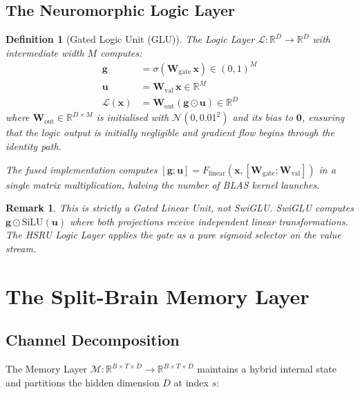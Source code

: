 \documentclass[11pt]{article}
\newtheorem{definition}{Definition}[section]
\newtheorem{remark}{Remark}[section]
\begin{document}
\subsection{The Neuromorphic Logic Layer}

\begin{definition}[Gated Logic Unit (GLU)]
The Logic Layer $\mathcal{L} : \mathbb{R}^D \to \mathbb{R}^D$ with intermediate width $M$ computes:
\begin{align}
    \mathbf{g} &= \sigma\!\left(\mathbf{W}_{\mathrm{gate}}\, \mathbf{x}\right) \in (0,1)^M \label{eq:gate} \\
    \mathbf{u} &= \mathbf{W}_{\mathrm{val}}\, \mathbf{x} \in \mathbb{R}^M \label{eq:val} \\
    \mathcal{L}(\mathbf{x}) &= \mathbf{W}_{\mathrm{out}}\!\left( \mathbf{g} \odot \mathbf{u} \right) \in \mathbb{R}^D \label{eq:glm_out}
\end{align}
where $\mathbf{W}_{\mathrm{out}} \in \mathbb{R}^{D \times M}$ is initialised with $\mathcal{N}(0, 0.01^2)$ and its bias to $\mathbf{0}$, ensuring that the logic output is initially negligible and gradient flow begins through the identity path.

The fused implementation computes $[\mathbf{g}; \mathbf{u}] = F_{\mathrm{linear}}(\mathbf{x}, [\mathbf{W}_{\mathrm{gate}};\mathbf{W}_{\mathrm{val}}])$ in a single matrix multiplication, halving the number of BLAS kernel launches.
\end{definition}

\begin{remark}
This is strictly a \emph{Gated Linear Unit}, not SwiGLU. SwiGLU computes $\mathbf{g} \odot \mathrm{SiLU}(\mathbf{u})$ where both projections receive independent linear transformations. The HSRU Logic Layer applies the gate as a pure sigmoid selector on the value stream.
\end{remark}

\section{The Split-Brain Memory Layer}

\subsection{Channel Decomposition}

The Memory Layer $\mathcal{M} : \mathbb{R}^{B \times T \times D} \to \mathbb{R}^{B \times T \times D}$ maintains a hybrid internal state and partitions the hidden dimension $D$ at index $s$:
\end{document}
